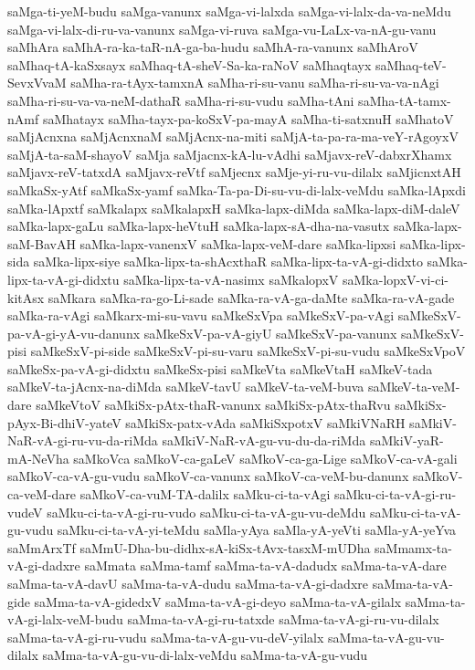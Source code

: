 {saMga-ti-yeM-budu
saMga-vanunx
saMga-vi-lalxda
saMga-vi-lalx-da-va-neMdu
saMga-vi-lalx-di-ru-va-vanunx
saMga-vi-ruva
saMga-vu-LaLx-va-nA-gu-vanu
saMhAra
saMhA-ra-ka-taR-nA-ga-ba-hudu
saMhA-ra-vanunx
saMhAroV
saMhaq-tA-kaSxsayx
saMhaq-tA-sheV-Sa-ka-raNoV
saMhaqtayx
saMhaq-teV-SevxVvaM
saMha-ra-tAyx-tamxnA
saMha-ri-su-vanu
saMha-ri-su-va-va-nAgi
saMha-ri-su-va-va-neM-dathaR
saMha-ri-su-vudu
saMha-tAni
saMha-tA-tamx-nAmf
saMhatayx
saMha-tayx-pa-koSxV-pa-mayA
saMha-ti-satxnuH
saMhatoV
saMjAcnxna
saMjAcnxnaM
saMjAcnx-na-miti
saMjA-ta-pa-ra-ma-veY-rAgoyxV
saMjA-ta-saM-shayoV
saMja
saMjacnx-kA-lu-vAdhi
saMjavx-reV-dabxrXhamx
saMjavx-reV-tatxdA
saMjavx-reVtf
saMjecnx
saMje-yi-ru-vu-dilalx
saMjicnxtAH
saMkaSx-yAtf
saMkaSx-yamf
saMka-Ta-pa-Di-su-vu-di-lalx-veMdu
saMka-lApxdi
saMka-lApxtf
saMkalapx
saMkalapxH
saMka-lapx-diMda
saMka-lapx-diM-daleV
saMka-lapx-gaLu
saMka-lapx-heVtuH
saMka-lapx-sA-dha-na-vasutx
saMka-lapx-saM-BavAH
saMka-lapx-vanenxV
saMka-lapx-veM-dare
saMka-lipxsi
saMka-lipx-sida
saMka-lipx-siye
saMka-lipx-ta-shAcxthaR
saMka-lipx-ta-vA-gi-didxto
saMka-lipx-ta-vA-gi-didxtu
saMka-lipx-ta-vA-nasimx
saMkalopxV
saMka-lopxV-vi-ci-kitAsx
saMkara
saMka-ra-go-Li-sade
saMka-ra-vA-ga-daMte
saMka-ra-vA-gade
saMka-ra-vAgi
saMkarx-mi-su-vavu
saMkeSxVpa
saMkeSxV-pa-vAgi
saMkeSxV-pa-vA-gi-yA-vu-danunx
saMkeSxV-pa-vA-giyU
saMkeSxV-pa-vanunx
saMkeSxV-pisi
saMkeSxV-pi-side
saMkeSxV-pi-su-varu
saMkeSxV-pi-su-vudu
saMkeSxVpoV
saMkeSx-pa-vA-gi-didxtu
saMkeSx-pisi
saMkeVta
saMkeVtaH
saMkeV-tada
saMkeV-ta-jAcnx-na-diMda
saMkeV-tavU
saMkeV-ta-veM-buva
saMkeV-ta-veM-dare
saMkeVtoV
saMkiSx-pAtx-thaR-vanunx
saMkiSx-pAtx-thaRvu
saMkiSx-pAyx-Bi-dhiV-yateV
saMkiSx-patx-vAda
saMkiSxpotxV
saMkiVNaRH
saMkiV-NaR-vA-gi-ru-vu-da-riMda
saMkiV-NaR-vA-gu-vu-du-da-riMda
saMkiV-yaR-mA-NeVha
saMkoVca
saMkoV-ca-gaLeV
saMkoV-ca-ga-Lige
saMkoV-ca-vA-gali
saMkoV-ca-vA-gu-vudu
saMkoV-ca-vanunx
saMkoV-ca-veM-bu-danunx
saMkoV-ca-veM-dare
saMkoV-ca-vuM-TA-dalilx
saMku-ci-ta-vAgi
saMku-ci-ta-vA-gi-ru-vudeV
saMku-ci-ta-vA-gi-ru-vudo
saMku-ci-ta-vA-gu-vu-deMdu
saMku-ci-ta-vA-gu-vudu
saMku-ci-ta-vA-yi-teMdu
saMla-yAya
saMla-yA-yeVti
saMla-yA-yeYva
saMmArxTf
saMmU-Dha-bu-didhx-sA-kiSx-tAvx-tasxM-mUDha
saMmamx-ta-vA-gi-dadxre
saMmata
saMma-tamf
saMma-ta-vA-dadudx
saMma-ta-vA-dare
saMma-ta-vA-davU
saMma-ta-vA-dudu
saMma-ta-vA-gi-dadxre
saMma-ta-vA-gide
saMma-ta-vA-gidedxV
saMma-ta-vA-gi-deyo
saMma-ta-vA-gilalx
saMma-ta-vA-gi-lalx-veM-budu
saMma-ta-vA-gi-ru-tatxde
saMma-ta-vA-gi-ru-vu-dilalx
saMma-ta-vA-gi-ru-vudu
saMma-ta-vA-gu-vu-deV-yilalx
saMma-ta-vA-gu-vu-dilalx
saMma-ta-vA-gu-vu-di-lalx-veMdu
saMma-ta-vA-gu-vudu
}
